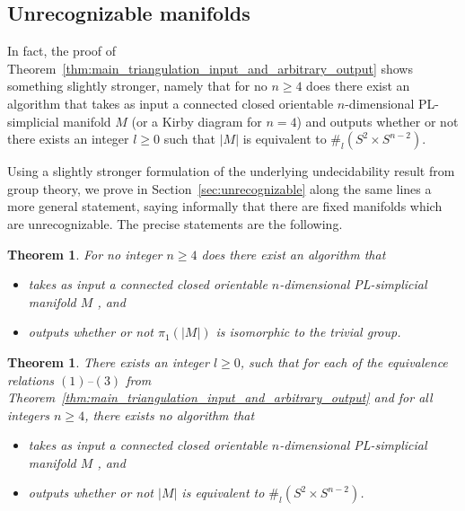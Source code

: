 \documentclass[a4paper, reqno]{amsart}
\newtheorem{theorem}[proposition]{Theorem}
\theoremstyle{definition}
\theoremstyle{remark}
\newcommand{\Z}{\mathbb{Z}}
\newcommand{\ttimes}{\mathbin{%
    \ooalign{\raise1.15ex\hbox{$\scriptstyle\sim$}\cr\hidewidth$\times$\hidewidth\cr}%
    }}
\renewcommand{\~}{\nobreak\ }
\begin{document}
\subsection*{Unrecognizable manifolds}

In fact, the proof of Theorem\~\ref{thm:main_triangulation_input_and_arbitrary_output} shows something slightly stronger, namely that for no $n\geq4$ does there exist an algorithm that takes as input a connected closed orientable $n$-dimensional PL-simplicial manifold $M$ (or a Kirby diagram for $n=4$) and outputs whether or not there exists an integer $l\geq0$ such that $|M|$ is equivalent to $\#_l(S^2\times S^{n-2})$.

Using a slightly stronger formulation of the underlying undecidability result from group theory, we prove in Section\~\ref{sec:unrecognizable} along the same lines a more general statement, saying informally that there are fixed manifolds which are unrecognizable. The precise statements are the following.

\begin{theorem}
\label{thm:pi_trivial}
For no integer $n\geq4$ does there exist an algorithm that 
\begin{itemize}
    \item takes as input a connected closed orientable $n$-dimensional PL-simplicial manifold $M$%
    , and 
    \item outputs whether or not $\pi_1(|M|)$ is isomorphic to the trivial group.
\end{itemize}
\end{theorem}

\begin{theorem}
\label{thm:unrecognizable_different_categories}
There exists an integer $l\geq0$, such that for each of the equivalence relations $(1)$--$(3)$ from Theorem\~\ref{thm:main_triangulation_input_and_arbitrary_output} and for all integers $n\geq4$, there exists no algorithm that 
\begin{itemize}
    \item takes as input a connected closed orientable $n$-dimensional PL-simplicial manifold $M$%
    , and 
    \item outputs whether or not $|M|$ is equivalent to $\#_l (S^2 \times S^{n-2})$.
\end{itemize}
\end{theorem}
\end{document}
